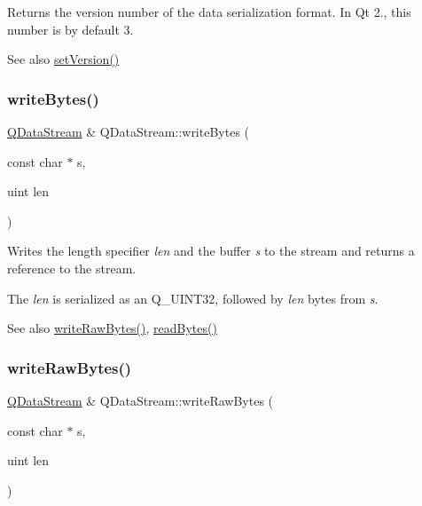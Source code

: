 Returns the version number of the data serialization format. In Qt 2., this number is by default 3. \begin{DoxySeeAlso}{See also}
\mbox{\hyperlink{class_q_data_stream_afdc50005a7d1651a711a54ec0869a22d}{set\+Version()}} 
\end{DoxySeeAlso}
\mbox{\label{class_q_data_stream_a8f1af77d483ecfd515c9eac3822aaaa5}} 
\subsubsection{\texorpdfstring{writeBytes()}{writeBytes()}}
{\footnotesize\ttfamily \mbox{\hyperlink{class_q_data_stream}{Q\+Data\+Stream}} \& Q\+Data\+Stream\+::write\+Bytes (\begin{DoxyParamCaption}\item[{const char $\ast$}]{s,  }\item[{uint}]{len }\end{DoxyParamCaption})}

Writes the length specifier {\itshape len} and the buffer {\itshape s} to the stream and returns a reference to the stream.

The {\itshape len} is serialized as an Q\+\_\+\+U\+I\+N\+T32, followed by {\itshape len} bytes from {\itshape s}.

\begin{DoxySeeAlso}{See also}
\mbox{\hyperlink{class_q_data_stream_aab2b83b4d7407ed57ff9eea136cb2e5e}{write\+Raw\+Bytes()}}, \mbox{\hyperlink{class_q_data_stream_a296311b844103880ec50b43a2ebbfcaa}{read\+Bytes()}} 
\end{DoxySeeAlso}
\mbox{\label{class_q_data_stream_aab2b83b4d7407ed57ff9eea136cb2e5e}} 
\subsubsection{\texorpdfstring{writeRawBytes()}{writeRawBytes()}}
{\footnotesize\ttfamily \mbox{\hyperlink{class_q_data_stream}{Q\+Data\+Stream}} \& Q\+Data\+Stream\+::write\+Raw\+Bytes (\begin{DoxyParamCaption}\item[{const char $\ast$}]{s,  }\item[{uint}]{len }\end{DoxyParamCaption})}

